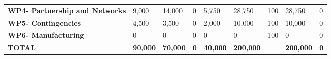 \begin{table}[H]
{\begin{tabular}{p{5cm}p{2cm}p{2cm}p{2.5cm}p{2cm}p{2cm}p{2cm}p{2cm}p{2cm}}
\textbf{WP4- Partnership and Networks} & 9,000                                                                  & 14,000                                                             &0                                                                                 & 5,750                                                                        & 28,750                                                                                        & 100                          & 28,750                          & 0                                                                         \\
\textbf{WP5- Contingencies}                                                        & 4,500                                                                  & 3,500                                                              &0                                                                                 & 2,000                                                                        & 10,000                                                                                        & 100                          & 10,000                          & 0                                                                         \\
\textbf{WP6- Manufacturing}                                                        &0                                                                        &0                                                                    &0                                                                                 & 0                                                                            & 0                                                                                             & 100                          & 0                               & 0                                                                         \\ \hline
\textbf{TOTAL}                                                                     & \textbf{90,000}                                                        & \textbf{70,000}                                                    & \textbf{0}                                                                      & \textbf{40,000}                                                              & \textbf{200,000}                                                                              & \textbf{}                    & \textbf{200,000}                & \textbf{0}                                                               
\\ \bottomrule[2pt]
\end{tabular} }
\end{table}


